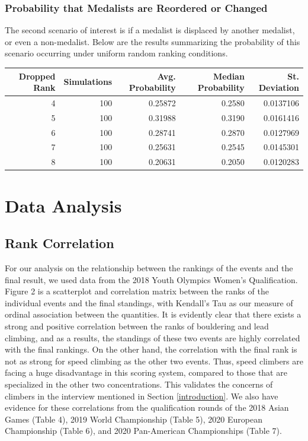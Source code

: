 \documentclass[12pt]{article}
\begin{document}
\hypertarget{probability-that-medalists-are-reordered-or-changed}{%
\subsubsection{Probability that Medalists are Reordered or
Changed}\label{probability-that-medalists-are-reordered-or-changed}}

The second scenario of interest is if a medalist is displaced by another
medalist, or even a non-medalist. Below are the results summarizing the
probability of this scenario occurring under uniform random ranking
conditions.

\begin{tabular}{rrrrr}
\toprule
Dropped Rank & Simulations & Avg. Probability & Median Probability & St. Deviation\\
\midrule
4 & 100 & 0.25872 & 0.2580 & 0.0137106\\
5 & 100 & 0.31988 & 0.3190 & 0.0161416\\
6 & 100 & 0.28741 & 0.2870 & 0.0127969\\
7 & 100 & 0.25631 & 0.2545 & 0.0145301\\
8 & 100 & 0.20631 & 0.2050 & 0.0120283\\
\bottomrule
\end{tabular}

\hypertarget{data-analysis}{%
\section{Data Analysis}\label{data-analysis}}

\hypertarget{rank-correlation}{%
\subsection{Rank Correlation}\label{rank-correlation}}

For our analysis on the relationship between the rankings of the events
and the final result, we used data from the 2018 Youth Olympics Women's
Qualification. Figure 2 is a scatterplot and correlation matrix between
the ranks of the individual events and the final standings, with
Kendall's Tau \citep{kendall1938} as our measure of ordinal association
between the quantities. It is evidently clear that there exists a strong
and positive correlation between the ranks of bouldering and lead
climbing, and as a results, the standings of these two events are highly
correlated with the final rankings. On the other hand, the correlation
with the final rank is not as strong for speed climbing as the other two
events. Thus, speed climbers are facing a huge disadvantage in this
scoring system, compared to those that are specialized in the other two
concentrations. This validates the concerns of climbers in the interview
mentioned in Section \ref{introduction}. We also have evidence for these
correlations from the qualification rounds of the 2018 Asian Games
(Table 4), 2019 World Championship (Table 5), 2020 European Championship
(Table 6), and 2020 Pan-American Championships (Table 7).
\end{document}

